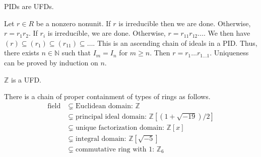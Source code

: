 \documentclass{mathnotes}
\begin{document}
\begin{prop}
  PIDs are UFDs.
\end{prop}

\begin{pf}
  Let $r\in R$ be a nonzero nonunit. If $r$ is irreducible then we are done.
  Otherwise, $r=r_1r_2$. If $r_i$ is irreducible, we are done. Otherwise,
  $r=r_{11}r_{12}\ldots$. We then have
  $(r)\subseteq(r_1)\subseteq(r_{11})\subseteq\ldots$. This is an ascending
  chain of ideals in a PID. Thus, there exists $n\in\mathbb{N}$ such that
  $I_m=I_n$ for $m\ge n$. Then $r=r_1\ldots r_{1\ldots1}$. Uniqueness can be
  proved by induction on $n$.
\end{pf}

\begin{cor}
  $\mathbb{Z}$ is a UFD.
\end{cor}

\begin{note}
  There is a chain of proper containment of types of rings as follows.
  \begin{align*}
    \text{field}
    &\subsetneq\text{Euclidean domain: }\mathbb{Z}\\
    &\subsetneq\text{principal ideal domain: }\mathbb{Z}[(1+\sqrt{-19})/2]\\
    &\subsetneq\text{unique factorization domain: }\mathbb{Z}[x]\\
    &\subsetneq\text{integral domain: }\mathbb{Z}[\sqrt{-5}]\\
    &\subsetneq\text{commutative ring with 1: }\mathbb{Z}_6
  \end{align*}
\end{note}
\end{document}
